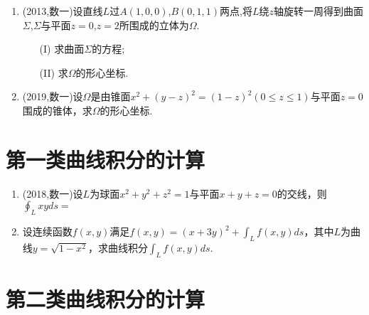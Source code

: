 \documentclass[12pt, a4paper, oneside, UTF8]{ctexbook}
\begin{document}
\begin{enumerate}[label=\arabic*.]
    \item (2013,数一)设直线$L$过$A(1,0,0)$,$B(0,1,1)$两点,将$L$绕$z$轴旋转一周得到曲面$\Sigma$,$\Sigma$与平面$z=0$,$z=2$所围成的立体为$\Omega$.
    \begin{enumerate}
        \item[(I)] 求曲面$\Sigma$的方程;
        \item[(II)] 求$\Omega$的形心坐标.
    \end{enumerate}
    
    \begin{solution}
    \newpage
    \end{solution}
    
    \item (2019,数一)设$\Omega$是由锥面$x^{2}+(y-z)^{2}=(1-z)^{2}(0\leq z\leq 1)$与平面$z=0$围成的锥体，求$\Omega$的形心坐标.
    
    \begin{solution}
    \newpage
    \end{solution}
\end{enumerate}

\section{第一类曲线积分的计算}

\begin{enumerate}[label=\arabic*.,start=3]
    \item (2018,数一)设$L$为球面$x^2+y^2+z^2=1$与平面$x+y+z=0$的交线，则$\oint_L xy ds=$
    
    \begin{solution}
    \newpage
    \end{solution}
    
    \item 设连续函数$f(x,y)$满足$f(x,y)=(x+3y)^2+\int_L f(x,y) ds$，其中$L$为曲线$y=\sqrt{1-x^2}$，求曲线积分$\int_L f(x,y) ds$.
    
    \begin{solution}
    \newpage
    \end{solution}
\end{enumerate}

\section{第二类曲线积分的计算}
\end{document}
